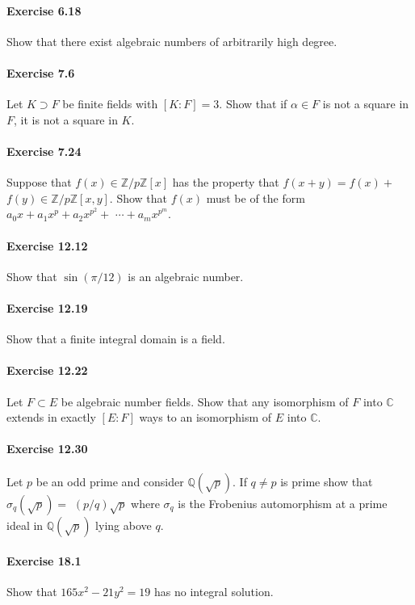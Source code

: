 \documentclass{article}
\begin{document}
\paragraph{Exercise 6.18} Show that there exist algebraic numbers of arbitrarily high degree.

\paragraph{Exercise 7.6} Let $K \supset F$ be finite fields with $[K: F]=3$. Show that if $\alpha \in F$ is not a square in $F$, it is not a square in $K$.

\paragraph{Exercise 7.24} Suppose that $f(x) \in \mathbb{Z} / p \mathbb{Z}[x]$ has the property that $f(x+y)=f(x)+$ $f(y) \in \mathbb{Z} / p \mathbb{Z}[x, y]$. Show that $f(x)$ must be of the form $a_{0} x+a_{1} x^{p}+a_{2} x^{p^{2}}+$ $\cdots+a_{m} x^{p^{m}}$.

\paragraph{Exercise 12.12} Show that $\sin (\pi / 12)$ is an algebraic number.

\paragraph{Exercise 12.19} Show that a finite integral domain is a field.

\paragraph{Exercise 12.22} Let $F \subset E$ be algebraic number fields. Show that any isomorphism of $F$ into $\mathbb{C}$ extends in exactly $[E: F]$ ways to an isomorphism of $E$ into $\mathbb{C}$.

\paragraph{Exercise 12.30} Let $p$ be an odd prime and consider $\mathbb{Q}(\sqrt{p})$. If $q \neq p$ is prime show that $\sigma_{q}(\sqrt{p})=$ $(p / q) \sqrt{p}$ where $\sigma_{q}$ is the Frobenius automorphism at a prime ideal in $\mathbb{Q}(\sqrt{p})$ lying above $q$.

\paragraph{Exercise 18.1} Show that $165 x^{2}-21 y^{2}=19$ has no integral solution.
\end{document}
